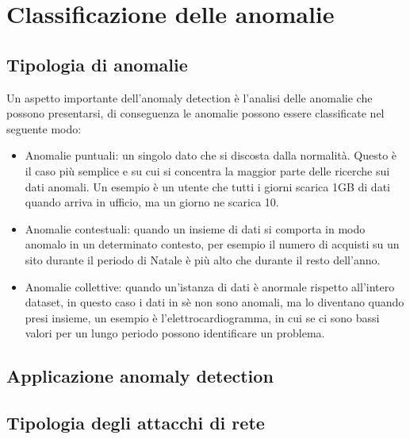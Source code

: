 \section{Classificazione delle anomalie}

\subsection{Tipologia di anomalie}
Un aspetto importante dell'anomaly detection è l'analisi delle anomalie che possono presentarsi, di conseguenza le anomalie possono essere classificate nel seguente modo:
\begin{itemize}
    \item Anomalie puntuali: un singolo dato che si discosta dalla normalità. Questo è il caso più semplice e su cui si concentra la maggior parte delle ricerche sui dati anomali. Un esempio è un utente che tutti i giorni scarica 1GB di dati quando arriva in ufficio, ma un giorno ne scarica 10.
    \item Anomalie contestuali: quando un insieme di dati si comporta in modo anomalo in un determinato contesto, per esempio il numero di acquisti su un sito durante il periodo di Natale è più alto che durante il resto dell'anno.
    \item Anomalie collettive: quando un'istanza di dati è anormale rispetto all'intero dataset, in questo caso i dati in sè non sono anomali, ma lo diventano quando presi insieme, un esempio è l'elettrocardiogramma, in cui se ci sono bassi valori per un lungo periodo possono identificare un problema.
\end{itemize}

\subsection{Applicazione anomaly detection}

\subsection{Tipologia degli attacchi di rete}
